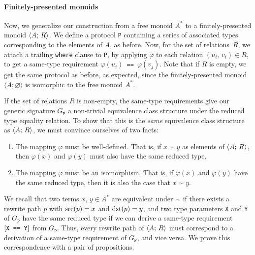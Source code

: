 \documentclass[../generics]{subfiles}
\begin{document}
\paragraph{Finitely-presented monoids}
Now, we generalize our construction from a free monoid $A^*$ to a finitely-presented monoid $\langle A;\,R\rangle$. We define a protocol \texttt{P} containing a series of associated types corresponding to the elements of $A$, as before. Now, for the set of relations~$R$, we attach a trailing \texttt{where} clause to \texttt{P}, by applying $\varphi$ to each relation $(u_i,\,v_i)\in R$, to get a same-type requirement \texttt{$\varphi(u_i)$ == $\varphi(v_j)$}. Note that if $R$ is empty, we get the same protocol as before, as expected, since the finitely-presented monoid $\langle A;\varnothing\rangle$ is isomorphic to the free monoid $A^*$.

If the set of relations $R$ is non-empty, the same-type requirements give our generic signature $G_\texttt{P}$ a non-trivial equivalence class structure under the reduced type equality relation. To show that this is the \emph{same} equivalence class structure as $\langle A;\,R\rangle$, we must convince ourselves of two facts:
\begin{enumerate}
\item The mapping $\varphi$ must be well-defined. That is, if $x\sim y$ as elements of $\langle A;\,R\rangle$, then $\varphi(x)$ and $\varphi(y)$ must also have the same reduced type.
\item The mapping $\varphi$ must be an isomorphism. That is, if $\varphi(x)$ and $\varphi(y)$ have the same reduced type, then it is also the case that $x\sim y$.
\end{enumerate}
We recall that two terms $x$, $y\in A^*$ are equivalent under $\sim$ if there exists a rewrite path $p$ with $\operatorname{src}(p)=x$ and $\operatorname{dst}(p)=y$, and two type parameters \texttt{X} and \texttt{Y} of $G_\texttt{P}$ have the same reduced type if we can derive a same-type requirement $[\texttt{X == Y}]$ from $G_\texttt{P}$. Thus, every rewrite path of $\langle A;\,R\rangle$ must correspond to a derivation of a same-type requirement of $G_\texttt{P}$, and vice versa. We prove this correspondence with a pair of propositions.
\end{document}
